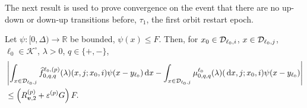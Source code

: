  The next result is used to prove convergence on the event that there are no up-down or down-up transitions before, \(\tau_1\), the first orbit restart epoch.
 \begin{lem}\label{lem: Dcoajc}
	Let \(\psi:[0,\Delta)\to \mathbb R\) be bounded, \(\psi(x)\leq F\). Then, for \(x_0\in\mathcal{D}_{\ell_0,i}\), \(x\in\mathcal{D}_{\ell_0,j}\), \(\ell_0\in\mathcal K^\circ\), \(\lambda > 0\), \(q\in\{+,-\}\), 
	\begin{align}
		&\left|\int_{x\in\mathcal D_{\ell_0,j}} \widehat f^{\ell_0,(p)}_{0,q,q}(\lambda)(x,j; x_0,i)\psi(x-y_{\ell_0})\, \mathrm{d} x - \int_{x\in\mathcal D_{\ell_0,j}} \mu^{\ell_0}_{0,q,q}(\lambda)(\, \mathrm{d} x,j; x_0,i)\psi(x-y_{\ell_0})\right| \nonumber 
		\\&\leq \left(R_{{\boldsymbol v},2}^{(p)} + \varepsilon^{(p)}G\right) F.
		\label{eqn: anue}
	\end{align} 
\end{lem}
